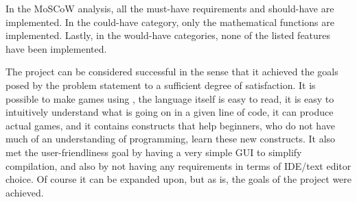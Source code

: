 In the MoSCoW analysis, all the must-have requirements and should-have are implemented. In the could-have category, only the mathematical functions are implemented. Lastly, in the would-have categories, none of the listed features have been implemented. 

The project can be considered successful in the sense that it achieved the goals posed by the problem statement to a sufficient degree of satisfaction.  It is possible to make games using \lang{}, the language itself is easy to read, it is easy to intuitively understand what is going on in a given line of code, it can produce actual games, and it contains constructs that help beginners, who do not have much of an understanding of programming, learn these new constructs. It also met the user-friendliness goal by having a very simple GUI to simplify compilation, and also by not having any requirements in terms of IDE/text editor choice. Of course it can be expanded upon, but as is, the goals of the project were achieved.